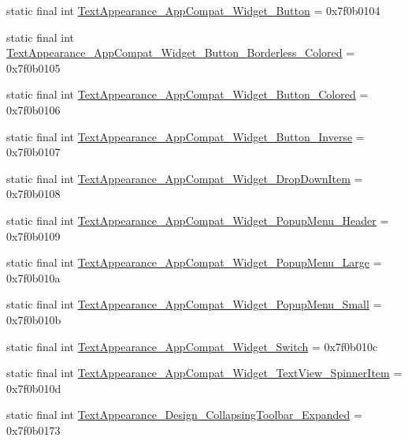 \begin{CompactItemize}
\item 
static final int \hyperlink{classandroid_1_1support_1_1v7_1_1appcompat_1_1_r_1_1style_731e1e3b2975be38dd72ede6becaa85b}{TextAppearance\_\-AppCompat\_\-Widget\_\-Button} = 0x7f0b0104
\item 
static final int \hyperlink{classandroid_1_1support_1_1v7_1_1appcompat_1_1_r_1_1style_87c6adc0238eab396d8f41237d07a643}{TextAppearance\_\-AppCompat\_\-Widget\_\-Button\_\-Borderless\_\-Colored} = 0x7f0b0105
\item 
static final int \hyperlink{classandroid_1_1support_1_1v7_1_1appcompat_1_1_r_1_1style_76c8e641ecf42cfa1e3c53c3d4c4d01e}{TextAppearance\_\-AppCompat\_\-Widget\_\-Button\_\-Colored} = 0x7f0b0106
\item 
static final int \hyperlink{classandroid_1_1support_1_1v7_1_1appcompat_1_1_r_1_1style_e10d2df81e53c5cd1f5b49a50f4afe13}{TextAppearance\_\-AppCompat\_\-Widget\_\-Button\_\-Inverse} = 0x7f0b0107
\item 
static final int \hyperlink{classandroid_1_1support_1_1v7_1_1appcompat_1_1_r_1_1style_bb958c51bd2858889c3ae1258b65e0c0}{TextAppearance\_\-AppCompat\_\-Widget\_\-DropDownItem} = 0x7f0b0108
\item 
static final int \hyperlink{classandroid_1_1support_1_1v7_1_1appcompat_1_1_r_1_1style_0f324c86b050d620e1a6dfc35a354ce7}{TextAppearance\_\-AppCompat\_\-Widget\_\-PopupMenu\_\-Header} = 0x7f0b0109
\item 
static final int \hyperlink{classandroid_1_1support_1_1v7_1_1appcompat_1_1_r_1_1style_63baf78fbc46e941226e92bb2b8c37c2}{TextAppearance\_\-AppCompat\_\-Widget\_\-PopupMenu\_\-Large} = 0x7f0b010a
\item 
static final int \hyperlink{classandroid_1_1support_1_1v7_1_1appcompat_1_1_r_1_1style_6b1b4c7038f7615298ccb69a704cc623}{TextAppearance\_\-AppCompat\_\-Widget\_\-PopupMenu\_\-Small} = 0x7f0b010b
\item 
static final int \hyperlink{classandroid_1_1support_1_1v7_1_1appcompat_1_1_r_1_1style_e0944de7d71b828f57d2039bfbd5ecd0}{TextAppearance\_\-AppCompat\_\-Widget\_\-Switch} = 0x7f0b010c
\item 
static final int \hyperlink{classandroid_1_1support_1_1v7_1_1appcompat_1_1_r_1_1style_ceeaba1304dc6c7ea7d242424c8f8509}{TextAppearance\_\-AppCompat\_\-Widget\_\-TextView\_\-SpinnerItem} = 0x7f0b010d
\item 
static final int \hyperlink{classandroid_1_1support_1_1v7_1_1appcompat_1_1_r_1_1style_bc80999d0be0b7d9e89a138a040b494a}{TextAppearance\_\-Design\_\-CollapsingToolbar\_\-Expanded} = 0x7f0b0173

\end{CompactItemize}
